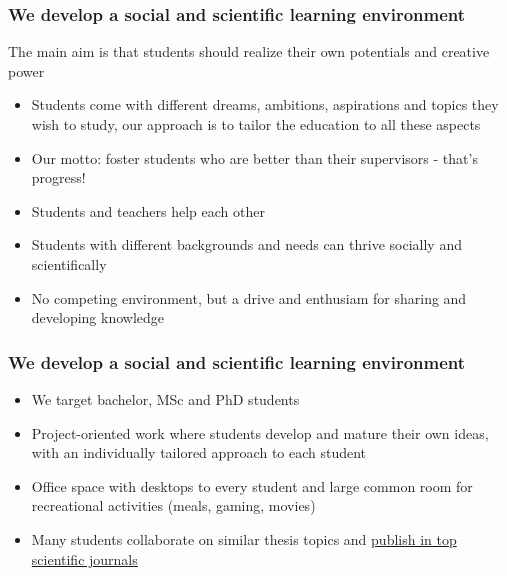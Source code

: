 \documentclass{beamer}
\begin{document}
\begin{frame}
\frametitle{We develop a social and scientific learning environment}

\begin{block}{}
The main aim is that students should realize their own potentials and creative power

\begin{itemize}
 \item Students come with different dreams, ambitions, aspirations and topics they wish to study, our approach is to tailor the education to all these aspects

 \item Our motto: foster students who are better than their supervisors - that's progress!

 \item Students and teachers help each other

 \item Students with different backgrounds and needs can thrive socially and scientifically

 \item No competing environment, but a drive and enthusiam for sharing and developing knowledge
\end{itemize}

\noindent
\end{block}
\end{frame}

\begin{frame}
\frametitle{We develop a social and scientific learning environment}

\begin{block}{}
\begin{itemize}
\item We target bachelor, MSc and PhD students

\item Project-oriented work where students develop and mature their own ideas, with an individually tailored approach to each student

\item Office space with desktops to every student and large common room for recreational activities (meals, gaming, movies)

\item Many students collaborate on similar  thesis topics and \href{{http://www.dn.no/talent/2014/06/12/Utdannelse/sommervikar-ble-toppforsker}}{publish in top scientific journals}
\end{itemize}

\noindent
\end{block}
\end{frame}
\end{document}
